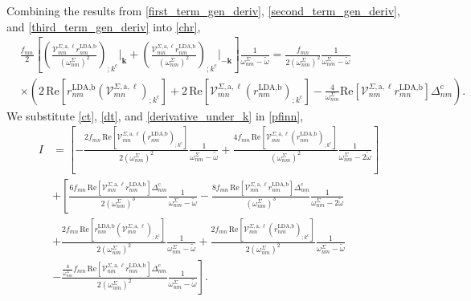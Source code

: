 Combining the results from \eqref{first_term_gen_deriv},
\eqref{second_term_gen_deriv}, and \eqref{third_term_gen_deriv}
into \eqref{chr},
\begin{align}\label{derivative_under_k}
&\frac{f_{mn}}{2}
\left[
\left(
\frac{\mathcal{V}^{\Sigma,\text{a},\ell}_{mn}
r^{\text{LDA,b}}_{nm}}{(\omega^\Sigma_{nm})^2}
\right)_{;k^{\text{c}}}\vert_{\mathbf{k}} 
+ \left(
  \frac{\mathcal{V}^{\Sigma,\text{a},\ell}_{mn}
  r^{\text{LDA,b}}_{nm}}{(\omega^\Sigma_{nm})^2}
  \right)_{;k^{\text{c}}}\vert_{-\mathbf{k}}
  \right]
  \frac{1}{\omega^\Sigma_{nm}-\tilde\omega}
= \frac{f_{mn}}{2(\omega^{\Sigma}_{nm})^{2}}
  \frac{1}{\omega^\Sigma_{nm}-\tilde\omega}\nonumber\\
& \times\left(
  2\,\mathrm{Re}\left[r^{\text{LDA,b}}_{nm}
  \left(
  \mathcal{V}^{\Sigma,\text{a},\ell}_{mn}
  \right)_{;k^{\text{c}}}
  \right]
+ 2\,\mathrm{Re}\left[\mathcal{V}^{\Sigma,\text{a},\ell}_{mn}
  \left(
  r^{\text{LDA,b}}_{nm}
  \right)_{;k^{\text{c}}}
  \right] 
- \frac{4}{\omega^{\Sigma}_{nm}}\mathrm{Re}
  \left[
  \mathcal{V}^{\Sigma,\text{a},\ell}_{nm}r^{\text{LDA,b}}_{mn}
  \right]
  \Delta_{nm}^{\text{c}}
  \right).
\end{align}
We substitute \eqref{ct}, \eqref{dt}, and \eqref{derivative_under_k} in 
\eqref{pfinn},
\begin{align*}
I
&=   \left[
    -\frac{2f_{mn}\,\mathrm{Re}
    \left[\mathcal{V}^{\Sigma,\text{a},\ell}_{mn}
    \left(r^{\text{LDA,b}}_{nm}\right)_{;k^{\text{c}}}\right]}
    {2(\omega^{\Sigma}_{nm})^{2}}\frac{1}{\omega^{\Sigma}_{nm}-\tilde\omega} 
+   \frac{4f_{mn}\,\mathrm{Re}\left[\mathcal{V}^{\Sigma,\text{a},\ell}_{mn}
    \left(r^{\text{LDA,b}}_{nm}\right)_{;k^{\text{c}}}\right]}
    {(\omega^{\Sigma}_{nm})^{2}}\frac{1}{\omega^{\Sigma}_{nm}-2\tilde\omega}
    \right]\nonumber\\
&+   \left[\frac{6f_{mn}\,\mathrm{Re}
    \left[\mathcal{V}^{\Sigma,\text{a},\ell}_{mn}r^{\text{LDA,b}}_{nm}\right]
    \Delta^{\text{c}}_{nm}}{2(\omega^{\Sigma}_{nm})^{3}}
    \frac{1}{\omega^{\Sigma}_{nm}-\tilde\omega} 
-   \frac{8f_{mn}\,\mathrm{Re}
    \left[\mathcal{V}^{\Sigma,\text{a},\ell}_{mn}r^{\text{LDA,b}}_{nm}\right]
    \Delta^{\text{c}}_{nm}}{(\omega^{\Sigma}_{nm})^{3}}
    \frac{1}{\omega^{\Sigma}_{nm}-2\tilde\omega}\right.\nonumber\\
&+ 
    \left.\frac{2f_{mn}\,\mathrm{Re}\left[r^{\text{LDA,b}}_{nm}
    \left(\mathcal{V}^{\Sigma,\text{a},\ell}_{mn}\right)_{;k^{\text{c}}}\right]}
    {2(\omega^{\Sigma}_{nm})^{2}}
    \frac{1}{\omega^\Sigma_{nm}-\tilde\omega}
+   \frac{2f_{mn}\,\mathrm{Re}\left[\mathcal{V}^{\Sigma,\text{a},\ell}_{mn}
    \left(r^{\text{LDA,b}}_{nm}\right)_{;k^{\text{c}}}\right]}
    {2(\omega^{\Sigma}_{nm})^{2}}
    \frac{1}{\omega^\Sigma_{nm}-\tilde\omega}\right.\\
&-   \left.\frac{\frac{4}{\omega^{\Sigma}_{nm}}f_{mn}\,\mathrm{Re}
    \left[\mathcal{V}^{\Sigma,\text{a},\ell}_{nm}r^{\text{LDA,b}}_{mn}\right]
    \Delta_{nm}^{\text{c}}}{2(\omega^{\Sigma}_{nm})^{2}}
    \frac{1}{\omega^\Sigma_{nm}-\tilde\omega}\right]
.
\end{align*}
